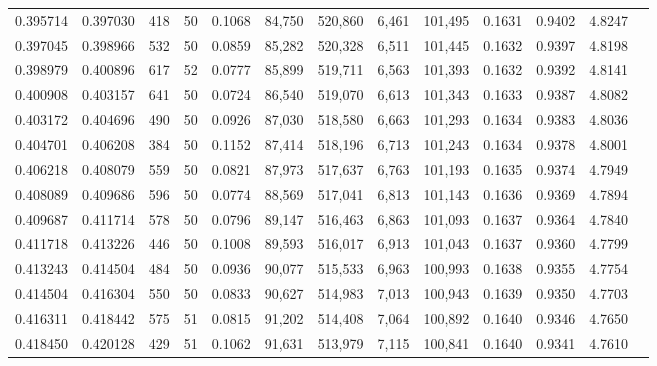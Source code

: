 \begin{tabular}{rrrrrrrrrrrrr}
0.395714 & 0.397030 &   418 &  50 &                                     0.1068 &  84,750 & 520,860 &   6,461 & 101,495 & 0.1631 & 0.9402 & 4.8247 \\
0.397045 & 0.398966 &   532 &  50 &                                     0.0859 &  85,282 & 520,328 &   6,511 & 101,445 & 0.1632 & 0.9397 & 4.8198 \\
0.398979 & 0.400896 &   617 &  52 &                                     0.0777 &  85,899 & 519,711 &   6,563 & 101,393 & 0.1632 & 0.9392 & 4.8141 \\
0.400908 & 0.403157 &   641 &  50 &                                     0.0724 &  86,540 & 519,070 &   6,613 & 101,343 & 0.1633 & 0.9387 & 4.8082 \\
0.403172 & 0.404696 &   490 &  50 &                                     0.0926 &  87,030 & 518,580 &   6,663 & 101,293 & 0.1634 & 0.9383 & 4.8036 \\
0.404701 & 0.406208 &   384 &  50 &                                     0.1152 &  87,414 & 518,196 &   6,713 & 101,243 & 0.1634 & 0.9378 & 4.8001 \\
0.406218 & 0.408079 &   559 &  50 &                                     0.0821 &  87,973 & 517,637 &   6,763 & 101,193 & 0.1635 & 0.9374 & 4.7949 \\
0.408089 & 0.409686 &   596 &  50 &                                     0.0774 &  88,569 & 517,041 &   6,813 & 101,143 & 0.1636 & 0.9369 & 4.7894 \\
0.409687 & 0.411714 &   578 &  50 &                                     0.0796 &  89,147 & 516,463 &   6,863 & 101,093 & 0.1637 & 0.9364 & 4.7840 \\
0.411718 & 0.413226 &   446 &  50 &                                     0.1008 &  89,593 & 516,017 &   6,913 & 101,043 & 0.1637 & 0.9360 & 4.7799 \\
0.413243 & 0.414504 &   484 &  50 &                                     0.0936 &  90,077 & 515,533 &   6,963 & 100,993 & 0.1638 & 0.9355 & 4.7754 \\
0.414504 & 0.416304 &   550 &  50 &                                     0.0833 &  90,627 & 514,983 &   7,013 & 100,943 & 0.1639 & 0.9350 & 4.7703 \\
0.416311 & 0.418442 &   575 &  51 &                                     0.0815 &  91,202 & 514,408 &   7,064 & 100,892 & 0.1640 & 0.9346 & 4.7650 \\
0.418450 & 0.420128 &   429 &  51 &                                     0.1062 &  91,631 & 513,979 &   7,115 & 100,841 & 0.1640 & 0.9341 & 4.7610 \\

\end{tabular}
